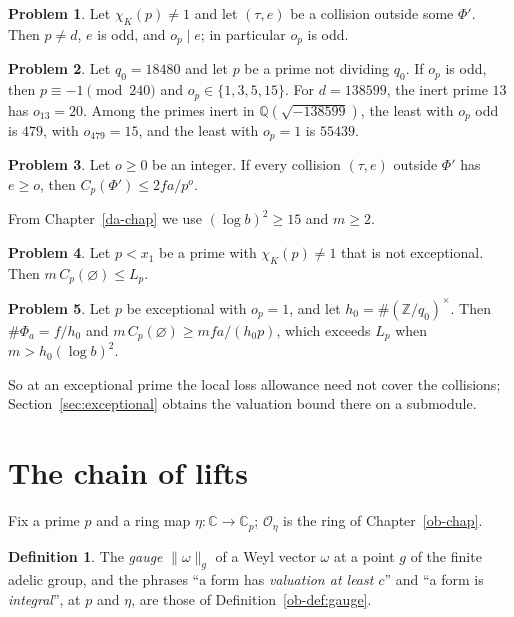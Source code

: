 \documentclass[reqno]{amsart}
\newcounter{chap}
\theoremstyle{definition}
\newtheorem{problem}{Problem}[section]
\theoremstyle{plain}
\theoremstyle{definition}
\newtheorem{definition}[theorem]{Definition}
\theoremstyle{remark}
\newcommand{\Z}{{\mathbb{Z}}}
\newcommand{\Q}{{\mathbb{Q}}}
\newcommand{\C}{{\mathbb{C}}}
\newcommand{\Oc}{\mathcal O}
\begin{document}
\begin{problem}\label{pr:collision-odd}
Let \(\chi_K(p) \ne 1\) and let \((\tau, e)\) be a collision outside some \(\Phi'\).  Then \(p \ne d\), \(e\) is odd, and \(o_p \mid e\); in particular \(o_p\) is odd.
\end{problem}

\begin{problem}\label{pr:o-example}
Let \(q_0 = 18480\) and let \(p\) be a prime not dividing \(q_0\).  If \(o_p\) is odd, then \(p \equiv -1 \pmod{240}\) and \(o_p \in \{1, 3, 5, 15\}\).  For \(d = 138599\), the inert prime \(13\) has \(o_{13} = 20\).  Among the primes inert in \(\Q(\sqrt{-138599})\), the least with \(o_p\) odd is \(479\), with \(o_{479} = 15\), and the least with \(o_p = 1\) is \(55439\).
\end{problem}

\begin{problem}\label{pr:geometric}
Let \(o \ge 0\) be an integer.  If every collision \((\tau, e)\) outside \(\Phi'\) has \(e \ge o\), then \(C_p(\Phi') \le 2fa/p^o\).
\end{problem}

From Chapter~\ref{da-chap} we use \((\log b)^2 \ge 15\) and \(m \ge 2\).

\begin{problem}\label{pr:non-exceptional}
Let \(p < x_1\) be a prime with \(\chi_K(p) \ne 1\) that is not exceptional.  Then \(m\, C_p(\varnothing) \le L_p\).
\end{problem}

\begin{problem}\label{pr:why-mark}
Let \(p\) be exceptional with \(o_p = 1\), and let \(h_0 = \#(\Z/q_0)^\times\).  Then \(\#\Phi_a = f/h_0\) and \(m\, C_p(\varnothing) \ge m f a/(h_0 p)\), which exceeds \(L_p\) when \(m > h_0(\log b)^2\).
\end{problem}

So at an exceptional prime the local loss allowance need not cover the collisions; Section~\ref{sec:exceptional} obtains the valuation bound there on a submodule.

\section{The chain of lifts}\label{sec:chain}

Fix a prime \(p\) and a ring map \(\eta\colon \C \to \C_p\); \(\Oc_\eta\) is the ring of Chapter~\ref{ob-chap}.

\begin{definition}\label{def:gauge}
The \emph{gauge} \(\lVert\omega\rVert_g\) of a Weyl vector \(\omega\) at a point \(g\) of the finite adelic group, and the phrases ``a form has \emph{valuation at least \(c\)}'' and ``a form is \emph{integral}'', at \(p\) and \(\eta\), are those of Definition~\ref{ob-def:gauge}.
\end{definition}
\end{document}
